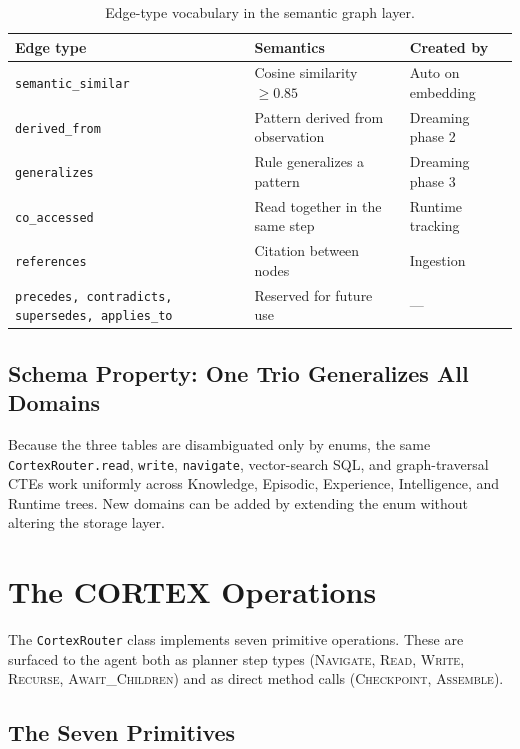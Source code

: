 \documentclass[11pt,a4paper]{article}
\theoremstyle{cortexprop}
\newcommand{\op}[1]{\textsc{#1}}
\newcommand{\code}[1]{\texttt{#1}}
\begin{document}
\begin{table}[h]
\centering
\caption{Edge-type vocabulary in the semantic graph layer.}
\label{tab:edgetypes}
\small
\begin{tabularx}{\linewidth}{lXl}
\toprule
\textbf{Edge type} & \textbf{Semantics} & \textbf{Created by}\\
\midrule
\code{semantic\_similar} & Cosine similarity $\geq 0.85$ & Auto on embedding \\
\code{derived\_from} & Pattern derived from observation & Dreaming phase 2 \\
\code{generalizes} & Rule generalizes a pattern & Dreaming phase 3 \\
\code{co\_accessed} & Read together in the same step & Runtime tracking \\
\code{references} & Citation between nodes & Ingestion \\
\code{precedes, contradicts, supersedes, applies\_to} & Reserved for future use & --- \\
\bottomrule
\end{tabularx}
\end{table}

\subsection{Schema Property: One Trio Generalizes All Domains}

Because the three tables are disambiguated only by enums, the same
\code{CortexRouter.read}, \code{write}, \code{navigate}, vector-search SQL,
and graph-traversal CTEs work uniformly across Knowledge, Episodic,
Experience, Intelligence, and Runtime trees. New domains can be added by
extending the enum without altering the storage layer.

\section{The CORTEX Operations}
\label{sec:ops}

The \code{CortexRouter} class implements seven primitive operations. These
are surfaced to the agent both as planner step types (\op{Navigate},
\op{Read}, \op{Write}, \op{Recurse}, \op{Await\_Children}) and as direct
method calls (\op{Checkpoint}, \op{Assemble}).

\subsection{The Seven Primitives}
\end{document}
